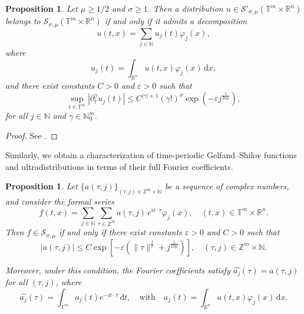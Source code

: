 \documentclass[12pt,reqno]{amsart}
\newtheorem{proposition}[theorem]{Proposition}
\theoremstyle{definition}
\numberwithin{equation}{section}
\begin{document}
\begin{proposition}\label{Thm-estimate-derivatives-functions}
	Let $\mu \geq 1/2$ and $\sigma \geq 1$. Then a distribution $u \in \mathcal{S}'_{\sigma,\mu}(\mathbb{T}^m \times \mathbb{R}^n)$ belongs to $\mathcal{S}_{\sigma,\mu}(\mathbb{T}^m \times \mathbb{R}^n)$ if and only if it admits a decomposition
	\[
	u(t,x) = \sum_{j \in \mathbb{N}} u_j(t) \varphi_j(x),
	\]
	where
	\[
	u_j(t) = \int_{\mathbb{R}^n} u(t,x)\varphi_j(x) \, \mathrm{d}x,
	\]
	and there exist constants $C > 0$ and $\varepsilon > 0$ such that
	\begin{equation} \label{deccoeff}
		\sup_{t \in \mathbb{T}^m} | \partial_t^\gamma u_j(t) | \leq 
		C^{|\gamma| + 1} (\gamma!)^{\sigma} \exp\left( -\varepsilon j^{\frac{1}{2n\mu}} \right),
	\end{equation}
	for all \(j \in \mathbb{N}\) and \( \gamma \in \mathbb{N}_0^m.\)
\end{proposition}

\begin{proof}
	See \cite[Theorem 2.4]{AviCap22}.
\end{proof}

Similarly, we obtain a characterization of time-periodic Gelfand–Shilov functions and ultradistributions in terms of their full Fourier coefficients.

\begin{proposition}\label{charac_full_fourier-functions}
	Let $\{a(\tau,j)\}_{(\tau,j) \in \mathbb{Z}^m \times \mathbb{N}}$ be a sequence of complex numbers, and consider the formal series
	\[
	f(t,x) = \sum_{j \in \mathbb{N}} \sum_{\tau \in \mathbb{Z}^m} a(\tau,j) \, e^{i t \cdot \tau} \varphi_j(x), \quad (t,x) \in \mathbb{T}^m \times \mathbb{R}^n.
	\]
	Then $f \in \mathcal{S}_{\sigma,\mu}$ if and only if there exist constants $\varepsilon > 0$ and $C > 0$ such that
	\begin{equation}\label{seq-full-coeff-funct}
		|a(\tau,j)| \leq C 
		\exp\left[-\varepsilon \left(\|\tau\|^{\frac{1}{\sigma}} + j^{\frac{1}{2n\mu}}\right)\right], \quad  (\tau,j) \in \mathbb{Z}^m \times \mathbb{N}.
	\end{equation}
	
	Moreover, under this condition, the Fourier coefficients satisfy $\widehat{a_j}(\tau) = a(\tau,j)$ for all $(\tau,j)$, where
	\[
	\widehat{a_j}(\tau) = \int_{\mathbb{T}^m} a_j(t) e^{-i t \cdot \tau} \, \mathrm{d}t, \quad \text{with} \quad a_j(t) = \int_{\mathbb{R}^n} a(t,x) \varphi_j(x) \, \mathrm{d}x.
	\]
\end{proposition}
\end{document}
